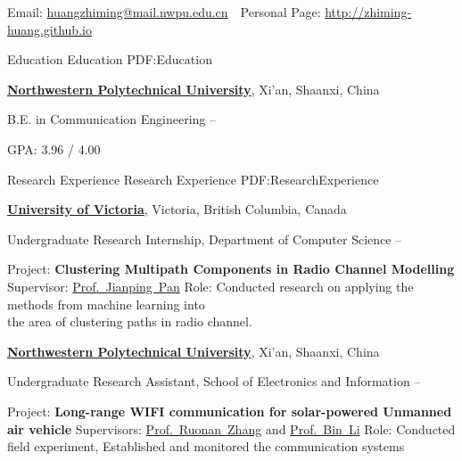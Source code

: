 \documentclass[letterpaper,MMMyyyy,nonstopmode]{simpleresumecv}
\newcommand{\CVAuthor}{Zhiming Huang}
\newcommand{\CVWebpage}{http://zhiming-huang.github.io}
\begin{document}

\Title{\CVAuthor}

\begin{SubTitle} Email:
\href{mailto:huangzhiming@mail.nwpu.edu.cn}
{huangzhiming@mail.nwpu.edu.cn}
\,\SubBulletSymbol\, Personal Page:
\href{\CVWebpage}
{\url{\CVWebpage}}
\end{SubTitle}

\begin{Body}


\Section
{Education}
{Education}
{PDF:Education}

\Entry
\href{http://en.nwpu.edu.cn/EnglishNew/AboutNPU/overviewnew.htm}
{\textbf{Northwestern Polytechnical University}},
Xi'an, Shaanxi, China

\Gap
\BulletItem
B.E. in
{Communication Engineering}
\hfill
{} --
\begin{Detail}
\SubBulletItem
GPA: 3.96 / 4.00
\end{Detail}


\Section
{Research Experience}
{Research Experience}
{PDF:ResearchExperience}

\Entry
\href{http://www.uvic.ca/}
{\textbf{University of Victoria}},
Victoria, British Columbia, Canada

\Gap
\BulletItem
Undergraduate Research Internship, Department of Computer Science
\hfill
{} --
\begin{Detail}
\SubBulletItem
Project:
\textbf{Clustering Multipath Components in Radio Channel Modelling}
\SubBulletItem
Supervisor:
\href{http://webhome.cs.uvic.ca/~pan/}
{Prof.~Jianping~Pan}
\SubBulletItem
Role:
Conducted research on applying the methods from machine learning into \\the area of clustering paths in radio channel.
\end{Detail}

\Entry
\href{http://en.nwpu.edu.cn/}
{\textbf{Northwestern Polytechnical University}},
Xi'an, Shaanxi, China

\Gap
\BulletItem
Undergraduate Research Assistant, School of Electronics and Information
\hfill
{} --
\begin{Detail}
\SubBulletItem
Project:
\textbf{Long-range WIFI communication for solar-powered Unmanned air vehicle}
\SubBulletItem
Supervisors:
\href{http://teacher.nwpu.edu.cn/rzhang}
{Prof.~Ruonan~Zhang} and
\href{http://teacher.nwpu.edu.cn/2014010059.html}
{Prof.~Bin~Li}
\SubBulletItem
Role: Conducted field experiment, Established and monitored the communication systems


\end{Detail}
\end{Body}
\end{document}

